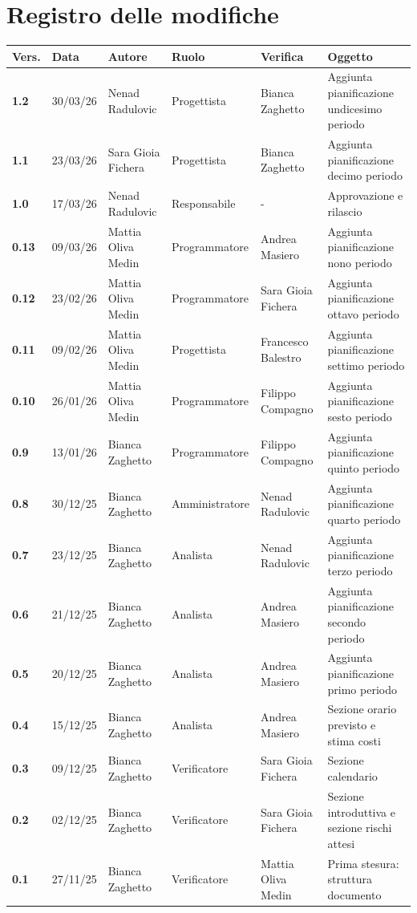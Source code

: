 \documentclass[a4paper,12pt]{article}
\begin{document}


\newpage
\section*{Registro delle modifiche}
\begin{xltabular}{\textwidth}{|l|l|X|l|X|X|}
\hline
\textbf{Vers.} & \textbf{Data} & \textbf{Autore} & \textbf{Ruolo} & \textbf{Verifica} & \textbf{Oggetto} \\
\hline
\endhead
\endfoot
\hline
\endlastfoot
\textbf{1.2} & 30/03/26 & Nenad Radulovic & Progettista & Bianca Zaghetto & Aggiunta pianificazione undicesimo periodo \\
\hline
\textbf{1.1} & 23/03/26 & Sara Gioia Fichera & Progettista & Bianca Zaghetto & Aggiunta pianificazione decimo periodo \\
\hline
\textbf{1.0} & 17/03/26 & Nenad Radulovic & Responsabile & - & Approvazione e rilascio \\
\hline
\textbf{0.13} & 09/03/26 & Mattia Oliva Medin & Programmatore & Andrea Masiero & Aggiunta pianificazione nono periodo \\
\hline
\textbf{0.12} & 23/02/26 & Mattia Oliva Medin & Programmatore & Sara Gioia Fichera & Aggiunta pianificazione ottavo periodo \\
\hline
\textbf{0.11} & 09/02/26 & Mattia Oliva Medin & Progettista & Francesco Balestro & Aggiunta pianificazione settimo periodo \\
\hline
\textbf{0.10} & 26/01/26 & Mattia Oliva Medin & Programmatore & Filippo Compagno & Aggiunta pianificazione sesto periodo \\
\hline
\textbf{0.9} & 13/01/26 & Bianca Zaghetto & Programmatore & Filippo Compagno & Aggiunta pianificazione quinto periodo \\
\hline
\textbf{0.8} & 30/12/25 & Bianca Zaghetto & Amministratore & Nenad Radulovic & Aggiunta pianificazione quarto periodo \\
\hline
\textbf{0.7} & 23/12/25 & Bianca Zaghetto & Analista & Nenad Radulovic & Aggiunta pianificazione terzo periodo \\
\hline
\textbf{0.6} & 21/12/25 & Bianca Zaghetto & Analista & Andrea Masiero & Aggiunta pianificazione secondo periodo \\
\hline
\textbf{0.5} & 20/12/25 & Bianca Zaghetto & Analista & Andrea Masiero & Aggiunta pianificazione primo periodo \\
\hline
\textbf{0.4} & 15/12/25 & Bianca Zaghetto & Analista & Andrea Masiero & Sezione orario previsto e stima costi \\
\hline
\textbf{0.3} & 09/12/25 & Bianca Zaghetto & Verificatore & Sara Gioia Fichera & Sezione calendario \\
\hline
\textbf{0.2} & 02/12/25 & Bianca Zaghetto & Verificatore & Sara Gioia Fichera & Sezione introduttiva e sezione rischi attesi \\
\hline
\textbf{0.1} & 27/11/25 & Bianca Zaghetto & Verificatore & Mattia Oliva Medin & Prima stesura: struttura documento \\
\hline
\end{xltabular}
\end{document}

